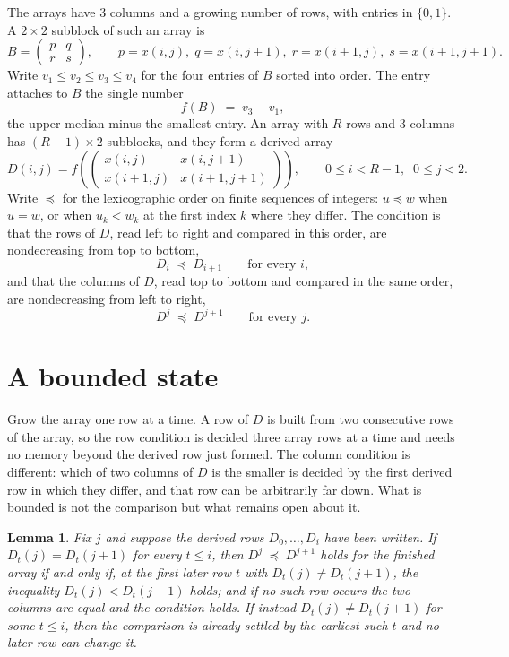 \documentclass[11pt,a4paper]{article}
\theoremstyle{plain}
\newtheorem{lemma}[theorem]{Lemma}
\theoremstyle{definition}
\begin{document}
The arrays have $3$ columns and a growing number of rows, with entries in $\{0,1\}$. A
$2\times2$ subblock of such an array is
\[
B=\begin{pmatrix} p & q \\ r & s \end{pmatrix},
\qquad p=x(i,j),\; q=x(i,j+1),\; r=x(i+1,j),\; s=x(i+1,j+1).
\]
Write $v_1\le v_2\le v_3\le v_4$ for the four entries of $B$ sorted into order. The entry attaches to $B$ the single number
\[
f(B)\;=\;v_3-v_1,
\]
the upper median minus the smallest entry. An array with $R$ rows and $3$ columns has $(R-1)\times2$ subblocks, and they
form a derived array
\[
D(i,j)=f\!\left(\begin{pmatrix} x(i,j) & x(i,j+1) \\ x(i+1,j) & x(i+1,j+1)\end{pmatrix}
\right),\qquad 0\le i<R-1,\;\; 0\le j<2 .
\]
Write $\preceq$ for the lexicographic order on finite sequences of integers: $u\preceq w$ when
$u=w$, or when $u_k<w_k$ at the first index $k$ where they differ. The condition is that the
rows of $D$, read left to right and compared in this order, are nondecreasing from top to bottom,
\[
D_{i}\;\preceq\;D_{i+1}\qquad\text{for every } i,
\]
and that the columns of $D$, read top to bottom and compared in the same order, are nondecreasing
from left to right,
\[
D^{j}\;\preceq\;D^{j+1}\qquad\text{for every } j .
\]

\section{A bounded state}

Grow the array one row at a time. A row of $D$ is built from two consecutive rows of the array,
so the row condition is decided three array rows at a time and needs no memory beyond the
derived row just formed. The column condition is different: which of two columns of $D$ is the
smaller is decided by the first derived row in which they differ, and that row can be
arbitrarily far down. What is bounded is not the comparison but what remains open about it.

\begin{lemma}\label{lem:bits}
Fix $j$ and suppose the derived rows $D_0,\dots,D_i$ have been written. If $D_t(j)=D_t(j+1)$ for
every $t\le i$, then $D^{j}\;\preceq\;D^{j+1}$ holds for the finished array if and only if,
at the first later row $t$ with $D_t(j)\neq D_t(j+1)$, the inequality $D_t(j)<D_t(j+1)$
holds; and if no such row occurs the two columns are equal and the condition holds. If instead
$D_t(j)\neq D_t(j+1)$ for some $t\le i$, then the comparison is already settled by the earliest
such $t$ and no later row can change it.
\end{lemma}
\end{document}
